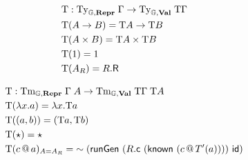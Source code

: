 \begin{align*}
   & \text{T}            : \text{Ty}_{{\mathbb{G}}, \textbf{Repr}} \; \Gamma \to \text{Ty}_{{\mathbb{G}}, \textbf{Val}}\; \text{T}\Gamma \\
   & \text{T}(A \to B)  = \text{T} A \to \text{T} B                                           \\
   & \text{T}(A \times B) = \text{T} A \times \text{T} B                                      \\
   & \text{T}(1) = 1                                                                      \\
   & \text{T}(A_R) = R.\textsf{R}
\end{align*}

\begin{align*}
   & \fun T            : \Tm_{\catG, \mR} \; \Gamma \; A \to \Tm_{\catG, \mV}\; \fun T\Gamma \; \fun T A                      \\
   & \fun T(\lambda x . a)  = \lambda x . \fun T a                                                                            \\
   & \fun T((a, b)) = (\fun T a, \fun T b)                                                                                    \\
   & \fun T(\star) = \star                                                                                                    \\
   & \fun T(c \,@\, a)_{A = A_R} = \splice{(\defin{runGen} \ (R.\defin{c} \ (\defin{known}\ (c \,@\, T'(a)))) \  \defin{id})}
\end{align*}

